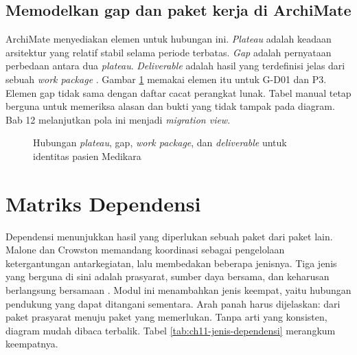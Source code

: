 \subsection*{Memodelkan gap dan paket kerja di ArchiMate}

ArchiMate menyediakan elemen untuk hubungan ini. \textit{Plateau} adalah keadaan arsitektur
yang relatif stabil selama periode terbatas. \textit{Gap} adalah pernyataan perbedaan antara
dua \textit{plateau}. \textit{Deliverable} adalah hasil yang terdefinisi jelas dari sebuah
\textit{work package} \cite{archimate32}. Gambar \ref{fig:ch11-pola-migrasi} memakai elemen itu
untuk G-D01 dan P3. Elemen gap tidak sama dengan daftar cacat perangkat lunak. Tabel manual tetap
berguna untuk memeriksa alasan dan bukti yang tidak tampak pada diagram. Bab 12 melanjutkan
pola ini menjadi \textit{migration view}.

\begin{figure}[!htb]
  \centering
  
  \caption{Hubungan \textit{plateau}, gap, \textit{work package}, dan \textit{deliverable} untuk
           identitas pasien Medikara}
  \label{fig:ch11-pola-migrasi}
\end{figure}

\section{Matriks Dependensi}

Dependensi menunjukkan hasil yang diperlukan sebuah paket dari paket lain. Malone dan Crowston
memandang koordinasi sebagai pengelolaan ketergantungan antarkegiatan, lalu membedakan beberapa
jenisnya. Tiga jenis yang berguna di sini adalah prasyarat, sumber daya bersama, dan keharusan
berlangsung bersamaan \cite{c11-malone1994}. Modul ini menambahkan jenis keempat, yaitu hubungan
pendukung yang dapat ditangani sementara. Arah panah harus dijelaskan: dari paket prasyarat
menuju paket yang memerlukan. Tanpa arti yang konsisten, diagram mudah dibaca terbalik. Tabel
\ref{tab:ch11-jenis-dependensi} merangkum keempatnya.

